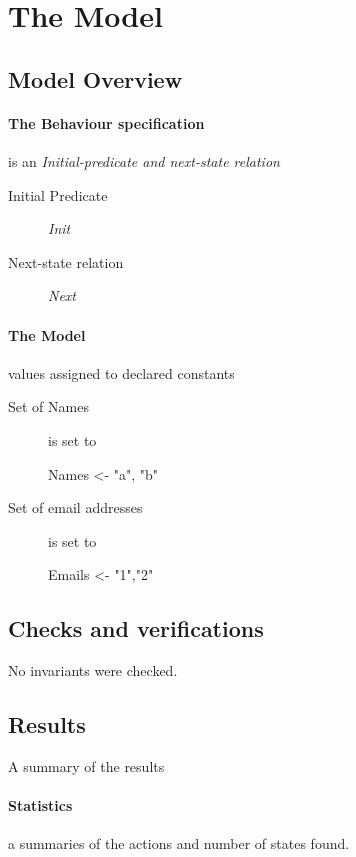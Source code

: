 \documentclass[12pt]{article}
\begin{document}
\section{The Model}

\subsection{Model Overview}
\paragraph{The Behaviour specification} is an \emph{Initial-predicate and
next-state relation} 
\begin{description}
	\item[Initial Predicate] \textit{Init}
	\item[Next-state relation] \textit{Next}
\end{description}
\paragraph{The Model} values assigned to declared constants
\begin{description}
	\item[Set of Names] is set to
\begin{tla}
Names <- { "a", "b" }
\end{tla}
\begin{tlatex}
%
\end{tlatex}
\item[Set of email addresses] is set to
\begin{tla}
Emails <- {"1","2"}
\end{tla}
\begin{tlatex}
%
\end{tlatex}
\end{description}

\subsection{Checks and verifications}
No invariants were checked.

\subsection{Results} A summary of the results
\paragraph{Statistics} a summaries of the actions and number of states
found.
\end{document}

